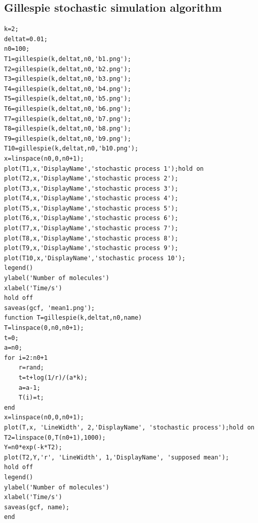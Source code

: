 \documentclass{article}
\begin{document}
\subsection{Gillespie stochastic simulation algorithm}
\begin{lstlisting}
k=2;
deltat=0.01;
n0=100;
T1=gillespie(k,deltat,n0,'b1.png');
T2=gillespie(k,deltat,n0,'b2.png');
T3=gillespie(k,deltat,n0,'b3.png');
T4=gillespie(k,deltat,n0,'b4.png');
T5=gillespie(k,deltat,n0,'b5.png');
T6=gillespie(k,deltat,n0,'b6.png');
T7=gillespie(k,deltat,n0,'b7.png');
T8=gillespie(k,deltat,n0,'b8.png');
T9=gillespie(k,deltat,n0,'b9.png');
T10=gillespie(k,deltat,n0,'b10.png');
x=linspace(n0,0,n0+1);
plot(T1,x,'DisplayName','stochastic process 1');hold on
plot(T2,x,'DisplayName','stochastic process 2');
plot(T3,x,'DisplayName','stochastic process 3');
plot(T4,x,'DisplayName','stochastic process 4');
plot(T5,x,'DisplayName','stochastic process 5');
plot(T6,x,'DisplayName','stochastic process 6');
plot(T7,x,'DisplayName','stochastic process 7');
plot(T8,x,'DisplayName','stochastic process 8');
plot(T9,x,'DisplayName','stochastic process 9');
plot(T10,x,'DisplayName','stochastic process 10');
legend()
ylabel('Number of molecules')
xlabel('Time/s')
hold off
saveas(gcf, 'mean1.png');
function T=gillespie(k,deltat,n0,name)
T=linspace(0,n0,n0+1);
t=0;
a=n0;
for i=2:n0+1
    r=rand;
    t=t+log(1/r)/(a*k);
    a=a-1;
    T(i)=t;
end
x=linspace(n0,0,n0+1);
plot(T,x, 'LineWidth', 2,'DisplayName', 'stochastic process');hold on
T2=linspace(0,T(n0+1),1000);
Y=n0*exp(-k*T2);
plot(T2,Y,'r', 'LineWidth', 1,'DisplayName', 'supposed mean');
hold off
legend()
ylabel('Number of molecules')
xlabel('Time/s')
saveas(gcf, name);
end
\end{lstlisting}
\end{document}
